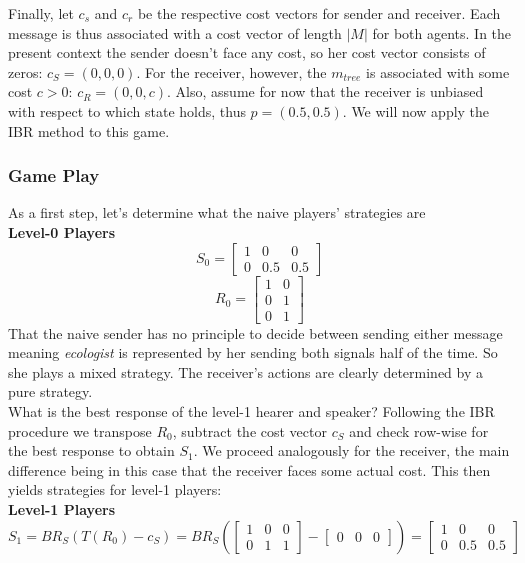 \documentclass[10]{article}
\begin{document}
Finally, let $c_s$ and $c_r$ be the respective cost vectors for sender and receiver. Each message is thus associated with a cost vector of length $|M|$ for both agents. In the present context the sender doesn't face any cost, so her cost vector consists of zeros: $c_S=(0,0,0)$. For the receiver, however, the $m_{tree}$ is associated with some cost $c>0$: $c_R=(0,0,c)$.
Also, assume for now that the receiver is unbiased with respect to which state holds, thus $p=(0.5,0.5)$.
We will now apply the IBR method to this game. 

\subsubsection{Game Play}
As a first step, let's determine what the naive players' strategies are\\
\textbf{Level-0 Players}\\
\begin{equation*}
S_0=
\begin{bmatrix}
1 & 0 & 0\\
0 & 0.5 & 0.5
\end{bmatrix}
\end{equation*}
\begin{equation*}
R_0=
\begin{bmatrix}
1 & 0\\
0 & 1\\
0 & 1
\end{bmatrix}
\end{equation*}
That the naive sender has no principle to decide between sending either message meaning \textit{ecologist} is represented by her sending both signals half of the time. So she plays a mixed strategy. The receiver's actions are clearly determined by a pure strategy.\\
What is the best response of the level-1 hearer and speaker? Following the IBR procedure we transpose $R_0$, subtract the cost vector $c_S$ and check row-wise for the best response to obtain $S_1$. We proceed analogously for the receiver, the main difference being in this case that the receiver faces some actual cost. This then yields strategies for level-1 players:\\
\textbf{Level-1 Players}\\
\begin{equation*}
S_1= BR_S(T(R_0)-c_S)=
BR_S(
\begin{bmatrix}
1 & 0 & 0\\
0 & 1 & 1
\end{bmatrix}
-
\begin{bmatrix}
0 & 0 & 0
\end{bmatrix}
)
=
\begin{bmatrix}
1 & 0 & 0\\
0 & 0.5 & 0.5
\end{bmatrix}
\end{equation*}
\end{document}
